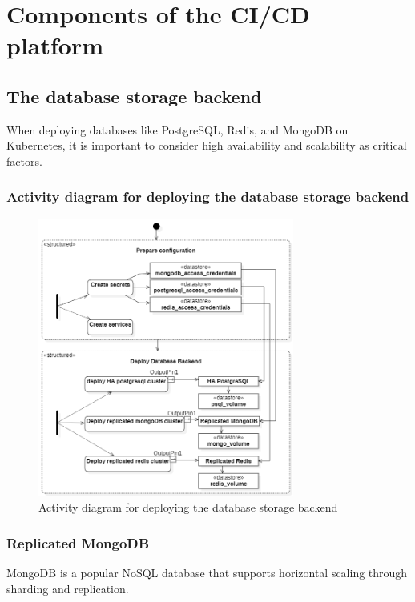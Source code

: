 \section{Components of the CI/CD platform }

\subsection{The database storage backend }

When deploying databases like PostgreSQL, Redis, and MongoDB on Kubernetes, it is important to consider high availability and scalability as critical factors. 

\subsubsection{Activity diagram for deploying the database storage backend }
\begin{figure}[H]\centering
\includegraphics[width=0.75\textwidth,angle=00]{assets/f35.png}
\caption{Activity diagram for deploying the database storage backend}
\label{fig:Activity diagram for deploying the database storage backend}
\end{figure}

\subsubsection{Replicated MongoDB }

MongoDB is a popular NoSQL database that supports horizontal scaling through sharding and replication.

